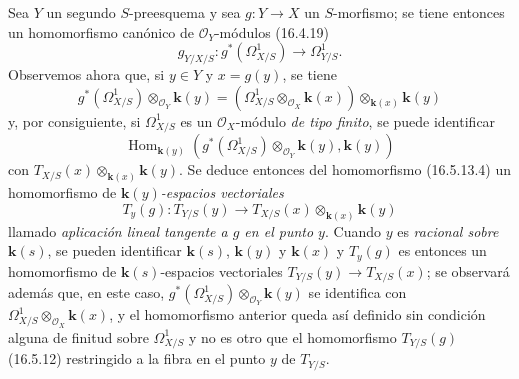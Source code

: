 \begin{env}[16.5.13]
Sea $Y$ un segundo $S$-preesquema y sea $g:Y\to X$ un $S$-morfismo; se tiene
entonces un homomorfismo canónico de $\mathcal{O}_Y$-módulos (16.4.19)
\[
  g_{Y/X/S}:g^*(\varOmega_{X/S}^1)\longrightarrow\varOmega_{Y/S}^1.
  \tag{16.5.13.4}
  \label{IV.16.5.13.4}
\]
Observemos ahora que, si $y\in Y$ y $x=g(y)$, se tiene
\[
  g^*(\varOmega_{X/S}^1)\otimes_{\mathcal{O}_Y}\boldsymbol{k}(y)
  =(\varOmega_{X/S}^1\otimes_{\mathcal{O}_X}\boldsymbol{k}(x))
  \otimes_{\mathbf{k}(x)}\boldsymbol{k}(y)
\]
y, por consiguiente, si $\varOmega_{X/S}^1$ es un $\mathcal{O}_X$-módulo
\emph{de tipo finito}, se puede identificar
\[
  \operatorname{Hom}_{\mathbf{k}(y)}
  (g^*(\varOmega_{X/S}^1)\otimes_{\mathcal{O}_Y}\boldsymbol{k}(y),\boldsymbol{k}(y))
\]
con $T_{X/S}(x)\otimes_{\mathbf{k}(x)}\boldsymbol{k}(y)$. Se deduce entonces del homomorfismo
(16.5.13.4) un homomorfismo de \emph{$\boldsymbol{k}(y)$-espacios vectoriales}
\[
  T_y(g):T_{Y/S}(y)\longrightarrow
  T_{X/S}(x)\otimes_{\mathbf{k}(x)}\boldsymbol{k}(y)
  \tag{16.5.13.5}
  \label{IV.16.5.13.5}
\]
llamado \emph{aplicación lineal tangente a $g$ en el punto $y$}. Cuando $y$ es
\emph{racional sobre $\boldsymbol{k}(s)$}, se pueden identificar $\boldsymbol{k}(s)$, $\boldsymbol{k}(y)$ y $\boldsymbol{k}(x)$ y
$T_y(g)$ es entonces un homomorfismo de $\boldsymbol{k}(s)$-espacios vectoriales
$T_{Y/S}(y)\to T_{X/S}(x)$; se observará además que, en este caso,
$g^*(\varOmega_{X/S}^1)\otimes_{\mathcal{O}_Y}\boldsymbol{k}(y)$ se identifica con
$\varOmega_{X/S}^1\otimes_{\mathcal{O}_X}\boldsymbol{k}(x)$, y el homomorfismo anterior queda
así definido sin condición alguna de finitud sobre $\varOmega_{X/S}^1$ y no es
otro que el homomorfismo $T_{Y/S}(g)$ (16.5.12) restringido a la fibra en el punto
$y$ de $T_{Y/S}$.
\end{env}

